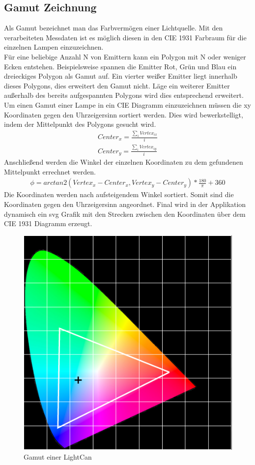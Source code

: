 \documentclass[11pt]{scrartcl}
\begin{document}
\subsection{Gamut Zeichnung}
Als Gamut bezeichnet man das Farbvermögen einer Lichtquelle. Mit den verarbeiteten Messdaten ist es möglich diesen in den CIE 1931 Farbraum für die einzelnen
Lampen einzuzeichnen.\\
Für eine beliebige Anzahl N von Emittern kann ein Polygon mit N oder weniger Ecken entstehen. Beispielsweise spannen die Emitter Rot, Grün und Blau ein
dreieckiges Polygon als Gamut auf. Ein vierter weißer Emitter liegt innerhalb dieses Polygons, dies erweitert den Gamut nicht. Läge ein weiterer Emitter außerhalb des
bereits aufgespannten Polygons wird dies entsprechend erweitert.\\
Um einen Gamut einer Lampe in ein CIE Diagramm einzuzeichnen müssen die xy Koordinaten gegen den Uhrzeigersinn sortiert werden. Dies wird bewerkstelligt, indem
der Mittelpunkt des Polygons gesucht wird.
\begin{align}\label{Equ:14}
    Center_x = \frac{\sum_{i}Vertex_{ix}}{i}\\
    Center_y = \frac{\sum_{i}Vertex_{iy}}{i}
\end{align}
Anschließend werden die Winkel der einzelnen Koordinaten zu dem gefundenen Mittelpunkt errechnet werden.
\begin{align}\label{Equ:15}
    \phi = arctan2(Vertex_x - Center_x, Vertex_y - Center_y)*\frac{180}{\pi}+360 %
\end{align}
Die Koordinaten werden nach aufsteigendem Winkel sortiert. Somit sind die Koordinaten gegen den Uhrzeigersinn angeordnet. Final wird in der Applikation dynamisch
ein \ac{svg} Grafik mit den Strecken zwischen den Koordinaten über dem CIE 1931 Diagramm erzeugt.\\
\begin{figure}[H]
    \begin{center}
        \includegraphics[width=.7\textwidth]{images/gamut_lightCan.png}
    \end{center}
    \caption{Gamut einer LightCan}
\end{figure}
\noindent
\end{document}
